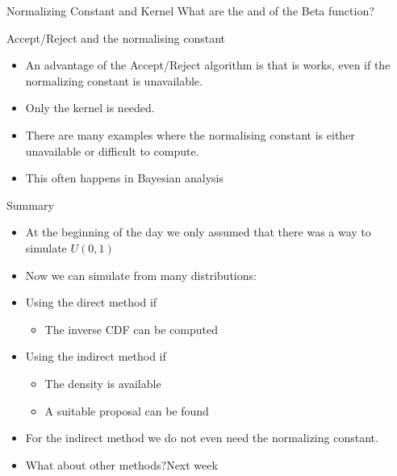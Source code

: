 \documentclass
[handout]
{beamer}
\begin{document}
\begin{frame}{Normalizing Constant and Kernel}
What are the 
and 
of the Beta function?
\pause
\end{frame}
\begin{frame}{Accept/Reject and the normalising constant}
\begin{itemize}
\item An advantage of the Accept/Reject algorithm is that is works, even if the normalizing constant is unavailable.
\pause
\item Only the kernel is needed.
\pause
\item There are many examples where the normalising constant is either unavailable or difficult to compute.
\pause
\item This often happens in Bayesian analysis
\end{itemize}
\end{frame}
\begin{frame}{Summary}
\begin{itemize}
\item At the beginning of the day we only assumed that there was a way to simulate $U(0,1)$
\pause
\item Now we can simulate from many distributions:
\pause
\item Using the direct method if
\pause
\begin{itemize}
\item The inverse CDF can be computed
\end{itemize}
\pause
\item Using the indirect method if
\pause
\begin{itemize}
\item The density is available
\item A suitable proposal can be found
\end{itemize}
\pause
\item For the indirect method we do not even need the normalizing constant.
\pause
\item What about other methods?\pause Next week
\end{itemize}
\end{frame}
\end{document}
